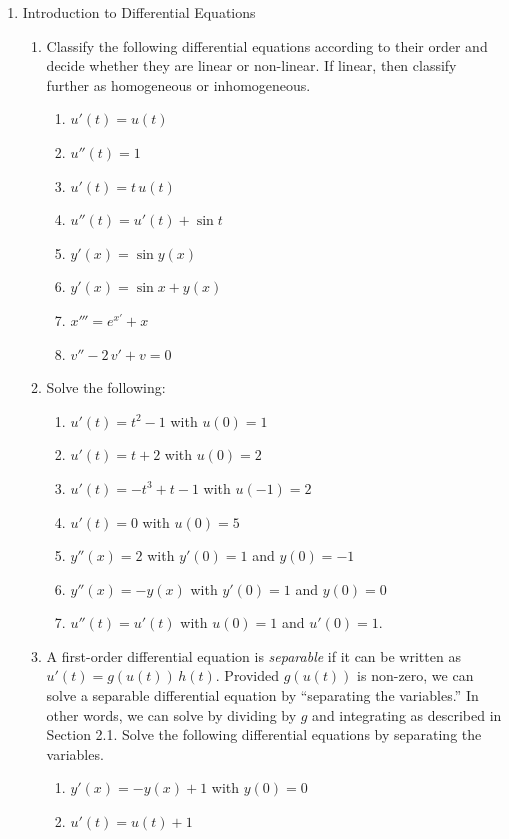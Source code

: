 \documentclass[11pt]{article}
\begin{document}
\begin{enumerate}
  \item Introduction to Differential Equations
    \begin{enumerate}
      \item Classify the following differential equations according to their order and decide whether they are linear or non-linear. If linear, then classify further as homogeneous or inhomogeneous.
        \begin{enumerate}
          \item $u'(t) = u(t)$
          \item $u''(t) = 1$
          \item $u'(t) = t\,u(t)$
          \item $u''(t) = u'(t) + \sin t$
          \item $y'(x) = \sin y(x)$
          \item $y'(x) = \sin x + y(x)$
          \item $x''' = e^{x'} + x$
          \item $v'' - 2\, v' + v = 0$
        \end{enumerate}
      \item Solve the following:
        \begin{enumerate}
          \item $u'(t) = t^2 - 1$ with $u(0) = 1$
          \item $u'(t) = t + 2$ with $u(0) = 2$ 
          \item $u'(t) = -t^3+t-1$ with $u(-1) = 2$
          \item $u'(t) = 0$ with $u(0) = 5$
          \item $y''(x) = 2$ with $y'(0) = 1$ and $y(0) = -1$
          \item $y''(x) = -y(x)$ with $y'(0) = 1$ and $y(0) = 0$
          \item $u''(t) = u'(t)$ with $u(0) = 1$ and $u'(0) =1$.
        \end{enumerate}
      \item A first-order differential equation is {\it separable} if it can be written as $u'(t) = g(u(t))\, h(t)$. Provided $g(u(t))$ is non-zero, we can solve a separable differential equation by ``separating the variables.'' In other words, we can solve by dividing by $g$ and integrating as described in Section 2.1. Solve the following differential equations by separating the variables.  
        \begin{enumerate}
          \item $y'(x) = -y(x) + 1$ with $y(0)=0$ 
          \item $u'(t) =  u(t) + 1$ 

\end{enumerate}
\end{enumerate}
\end{enumerate}
\end{document}
